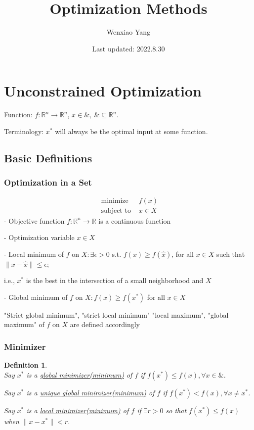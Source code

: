 \documentclass[11pt,a4paper]{article}
\title{Optimization Methods}
\author[*]{Wenxiao Yang}
\affil[*]{Department of Mathematics, University of Illinois at Urbana-Champaign}
\date{Last updated: 2022.8.30}
\newtheorem{definition}{Definition}
\begin{document}
\maketitle
\tableofcontents
\newpage

\section{Unconstrained Optimization}
Function: $f:\mathbb{R}^n \rightarrow	\mathbb{R}^n$, $x\in \&,\ \&\subseteq \mathbb{R}^n$.

Terminology: $x^*$ will always be the optimal input at some function.

\subsection{Basic Definitions}
\subsubsection{Optimization in a Set}
$$\begin{array}{ll}\text { minimize } & f(x) \\ \text { subject to } & x \in X\end{array}$$
- Objective function $f: \mathbb{R}^{n} \rightarrow \mathbb{R}$ is a continuous function

- Optimization variable $x \in X$

- Local minimum of $f$ on $X: \exists \epsilon>0$ s.t. $f(x) \geq f(\hat{x})$, for all $x \in X$ such that $\|x-\hat{x}\| \leq \epsilon$;

i.e., $x^{*}$ is the best in the intersection of a small neighborhood and $X$

- Global minimum of $f$ on $X: f(x) \geq f\left(x^{*}\right)$ for all $x \in X$

"Strict global minimum", "strict local minimum" "local maximum", "global maximum" of $f$ on $X$ are defined accordingly

\subsubsection{Minimizer}
\begin{definition}
    \quad\\
    Say $x^*$ is a \underline{global minimizer(minimum)} of $f$ if $f(x^*)\leq f(x), \forall x\in \&$.

    Say $x^*$ is a \underline{unique global minimizer(minimum)} of $f$ if $f(x^*)< f(x), \forall x\neq x^*$.

    Say $x^*$ is a \underline{local minimizer(minimum)} of $f$ if $\exists r>0$ so that $f(x^*)\leq f(x)$ when $\|x-x^*\|<r$.
\end{definition}
\end{document}
